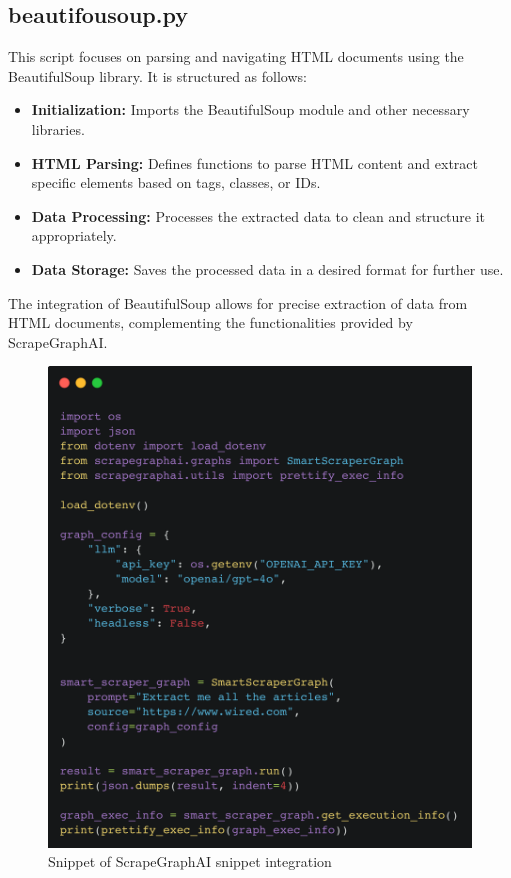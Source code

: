 \subsection{beautifousoup.py}

This script focuses on parsing and navigating HTML documents using the BeautifulSoup library. It is structured as follows:

\begin{itemize}
    \item \textbf{Initialization:} Imports the BeautifulSoup module and other necessary libraries.
    \item \textbf{HTML Parsing:} Defines functions to parse HTML content and extract specific elements based on tags, classes, or IDs.
    \item \textbf{Data Processing:} Processes the extracted data to clean and structure it appropriately.
    \item \textbf{Data Storage:} Saves the processed data in a desired format for further use.
\end{itemize}

The integration of BeautifulSoup allows for precise extraction of data from HTML documents, complementing the functionalities provided by ScrapeGraphAI.

\begin{figure}[H]
    \centering
    \includegraphics[width=0.95\linewidth]{Assets/smart_scraper_wired.png}
    \caption{Snippet of ScrapeGraphAI snippet integration}
    \label{fig:smart_scraper_wired}
\end{figure}

